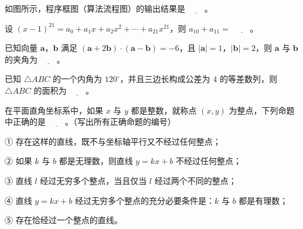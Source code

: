 \Needspace{0.4\textheight}
\begin{question}
如图所示，程序框图（算法流程图）的输出结果是 $\underline{\qquad}$。
\nopagebreak[4]
\begin{center}\end{center}
\nopagebreak[4]
\end{question}
\begin{question}
设 $(x-1)^{21}=a_0+a_1x+a_2x^2+\cdots+a_{21}x^{21}$，则 $a_{10}+a_{11}=$ $\underline{\qquad}$。

\end{question}
\begin{question}
已知向量 $\boldsymbol a$，$\boldsymbol b$ 满足 $(\boldsymbol a+2\boldsymbol b)\cdot(\boldsymbol a-\boldsymbol b)=-6$，且 $|\boldsymbol a|=1$，$|\boldsymbol b|=2$，则 $\boldsymbol a$ 与 $\boldsymbol b$ 的夹角为 $\underline{\qquad}$。

\end{question}
\begin{question}
已知 $\triangle ABC$ 的一个内角为 $120^\circ$，并且三边长构成公差为 $4$ 的等差数列，则 $\triangle ABC$ 的面积为 $\underline{\qquad}$。

\end{question}
\begin{question}
在平面直角坐标系中，如果 $x$ 与 $y$ 都是整数，就称点 $(x,y)$ 为整点，下列命题中正确的是 $\underline{\qquad}$。（写出所有正确命题的编号）

① 存在这样的直线，既不与坐标轴平行又不经过任何整点；

② 如果 $k$ 与 $b$ 都是无理数，则直线 $y=kx+b$ 不经过任何整点；

③ 直线 $l$ 经过无穷多个整点，当且仅当 $l$ 经过两个不同的整点；

④ 直线 $y=kx+b$ 经过无穷多个整点的充分必要条件是：$k$ 与 $b$ 都是有理数；

⑤ 存在恰经过一个整点的直线。

\end{question}

